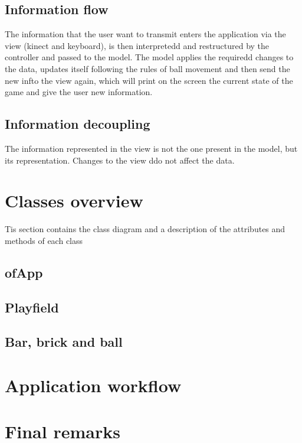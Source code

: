 \documentclass[]{article}
\begin{document}
\subsection{Information flow}
The information that the user want to transmit enters the application via the view (kinect and keyboard), is then interpretedd and restructured by the controller and passed to the model. The model applies the requiredd changes to the data, updates itself following the rules of ball movement and then send the new infto the view again, which will print on the screen the current state of the game and give the user new information.\\
\subsection{Information decoupling}
The information represented in the view is not the one present in the model, but its representation. Changes to the view ddo not affect the data.
\section{Classes overview}
Tis section contains the class diagram and a description of the attributes and methods of each class
\subsection{ofApp}
\subsection{Playfield}
\subsection{Bar, brick and ball}
\section{Application workflow}
\section{Final remarks}  
\end{document}
